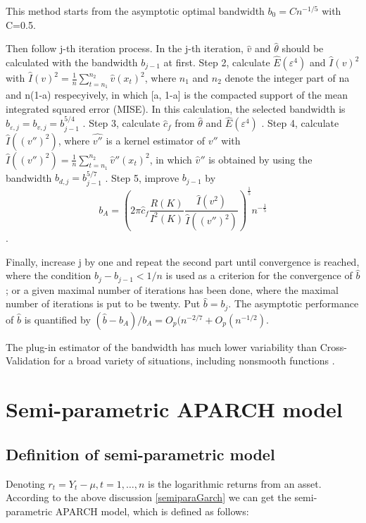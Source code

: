 This method starts from the asymptotic optimal bandwidth $b_{0}= Cn^{-1/5}$ with C=0.5.

Then follow j-th iteration process. In the j-th iteration, $\hat{v}$  and $\hat{\theta}$  should be calculated with the bandwidth $b_{j-1}$  at first. Step 2, calculate $\hat{E}(\varepsilon^{4})$ and $\hat{I}(v)^{2}$  with   $\hat{I}(v)^{2} = \frac{1}{n}\sum_{t=n_{1}}^{n_{2}}\hat{v}(x_{t})^{2}$, where $n_{1}$  and $n_{2}$ denote the integer part of na and n(1-a) respecyively, in which [a, 1-a] is the compacted support of the mean integrated squared error (MISE). In this calculation, the selected bandwidth is $b_{\varepsilon,j}=b_{v,j}=b_{j-1}^{5/4}$ . Step 3, calculate $\hat{c}_{f}$  from $\hat{\theta}$  and $\hat{E}(\varepsilon^{4})$ . Step 4, calculate $\hat{I}((v'')^{2})$, where $\hat{v''}$  is a kernel estimator of   $v''$  with $\hat{I}((v'')^{2})= \frac{1}{n}\sum_{t=n_{1}}^{n_{2}}\hat{v}''(x_{t})^{2}$, in which $\hat{v}''$ is obtained by using the bandwidth $b_{d,j}=b_{j-1}^{5/7}$ . Step 5, improve $b_{j-1}$  by 
\[ b_{A} =(2\pi \hat{c}_{f} \frac{R(K)}{I^{2}(K)}\frac{\hat{I}(v^{2})}{\hat{I}((v'')^2)})^{\frac{1}{5}}n^{-\frac{1}{5}} \].

Finally, increase j by one and repeat the second part until convergence is reached, where the condition $b_{j} - b_{j-1} <1/n$  is used as a criterion for the convergence of $\hat{b}$ ; or a given maximal number of iterations has been done, where the maximal number of iterations is put to be twenty. Put $\hat{b} = b_{j}$. The asymptotic performance of $\hat{b}$ is quantified by $(\hat{b}-b_{A})/b_{A}=O_{p}(n^{-2/7}+O_{p}(n^{-1/2})$.

The plug-in estimator of the bandwidth has much lower variability than Cross- Validation for a broad variety of situations, including nonsmooth functions \cite{Gasser1991} \citep{Feng2004}.

\section{Semi-parametric APARCH model}
\subsection{Definition of semi-parametric model}

Denoting $r_{t}= Y_t-\mu,t=1, \ldots,n$ is the logarithmic returns from an asset. According to the above discussion \ref{semiparaGarch} we can get the semi-parametric APARCH model, which is defined as follows:

